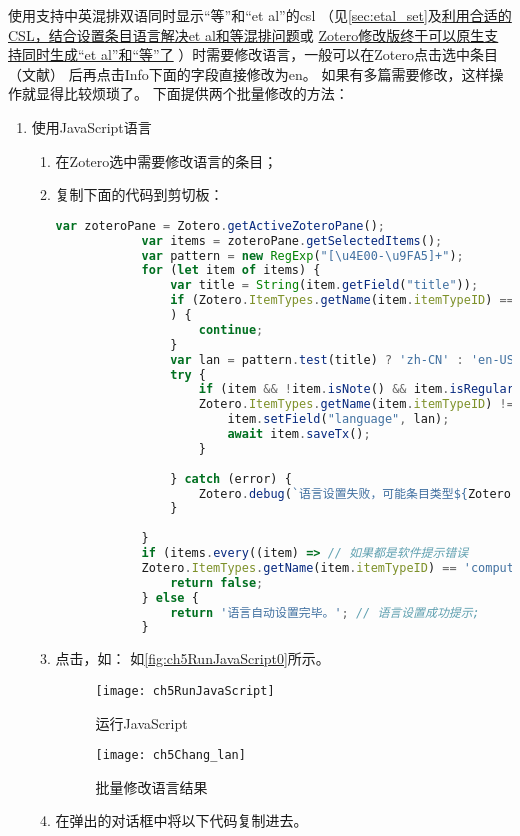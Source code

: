 \documentclass[theorem=false,mathfont=none,openany,sub3section]{easybook}
\begin{document}
{使用支持中英混排双语同时显示“等”和“et al”的csl
（见\cref{sec:etal_set}及\href{https://gitee.com/zotero-chinese/zotero-chinese/issues/I4YKIN}{利用合适的CSL，结合设置条目语言解决et al和等混排问题}或
\href{https://zhuanlan.zhihu.com/p/314928204}
{Zotero修改版终于可以原生支持同时生成“et al”和“等”了}
）时需要修改语言，一般可以在Zotero点击选中条目（文献）
后再点击Info下面的字段直接修改为en。
如果有多篇需要修改，这样操作就显得比较烦琐了。
下面提供两个批量修改的方法：
\begin{enumerate}
	\item 使用JavaScript语言
	\begin{enumerate}[(1)]
		\item 在Zotero选中需要修改语言的条目；
		\item 复制下面的代码到剪切板：
		\begin{lstlisting}[language=JavaScript]
			var zoteroPane = Zotero.getActiveZoteroPane();
			var items = zoteroPane.getSelectedItems();
			var pattern = new RegExp("[\u4E00-\u9FA5]+");
			for (let item of items) {
				var title = String(item.getField("title"));
				if (Zotero.ItemTypes.getName(item.itemTypeID) == 'computerProgram' // 文献类型为软件时返回
				) {
					continue;
				}
				var lan = pattern.test(title) ? 'zh-CN' : 'en-US';
				try {
					if (item && !item.isNote() && item.isRegularItem() &&
					Zotero.ItemTypes.getName(item.itemTypeID) != 'computerProgram') { //正常条目，非笔记设置语言
						item.setField("language", lan);
						await item.saveTx();
					}
					
				} catch (error) {
					Zotero.debug(`语言设置失败，可能条目类型${Zotero.ItemTypes.getName(item.itemTypeID)}不能设置语言。`)
				}
				
			}
			if (items.every((item) => // 如果都是软件提示错误
			Zotero.ItemTypes.getName(item.itemTypeID) == 'computerProgram')) {
				return false;
			} else {
				return '语言自动设置完毕。'; // 语言设置成功提示;
			}
		\end{lstlisting}
		\item 点击，如：
		如\autoref{fig:ch5RunJavaScript0}所示。
		
		\begin{figure}[htbp]
			\centering
			\texttt{[image: ch5RunJavaScript]}
			\caption{运行JavaScript}
			\label{fig:ch5RunJavaScript0}
		\end{figure}
		\begin{figure}[htbp]
			\centering
			\texttt{[image: ch5Chang\_lan]}
			\caption{批量修改语言结果}
			\label{fig:ch5Chang_lan}
		\end{figure}
		\item 在弹出的对话框中将以下代码复制进去。
	

\end{enumerate}
\end{enumerate}}
\end{document}

